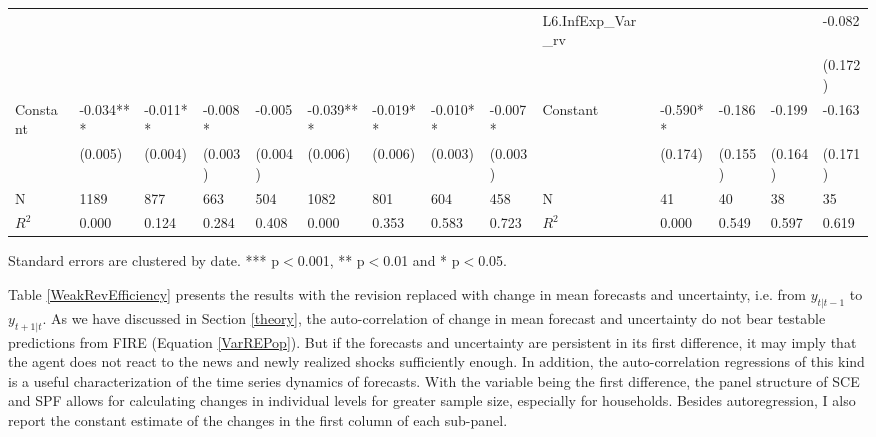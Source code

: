 \documentclass[12pt]{article}
\begin{document}
\begin{table}
\begin{adjustbox}{width={24cm},totalheight={14cm}}
\begin{threeparttable}
\begin{tabular}{llllllllllllll}
					&               &           &          &          &               &           &           &           & L6.InfExp\_Var\_rv  &               &          &          & -0.082   \\
					&               &           &          &          &               &           &           &           &                     &               &          &          & (0.172)  \\
					Constant               & -0.034***     & -0.011**  & -0.008*  & -0.005   & -0.039***     & -0.019**  & -0.010**  & -0.007*   & Constant               & -0.590**      & -0.186   & -0.199   & -0.163   \\
					& (0.005)       & (0.004)   & (0.003)  & (0.004)  & (0.006)       & (0.006)   & (0.003)   & (0.003)   &                     & (0.174)       & (0.155)  & (0.164)  & (0.171)  \\
					\hline 
					N                   & 1189          & 877       & 663      & 504      & 1082          & 801       & 604       & 458       & N                   & 41            & 40       & 38       & 35       \\
					$R^2$               & 0.000         & 0.124     & 0.284    & 0.408    & 0.000         & 0.353     & 0.583     & 0.723     & $R^2$               & 0.000         & 0.549    & 0.597    & 0.619 \\
					\hline    
				\end{tabular}
					\begin{tablenotes}
						\item Standard errors are clustered by date. *** p$<$0.001, ** p$<$0.01 and * p$<$0.05. 
					\end{tablenotes}
				\end{threeparttable}
				\end{adjustbox}
		\end{table}
	
	
	Table \ref{WeakRevEfficiency} presents the results with the revision replaced with change in mean forecasts and uncertainty, i.e. from $y_{t|t-1}$ to $y_{t+1|t}$. As we have discussed in Section \ref{theory}, the auto-correlation of change in mean forecast and uncertainty do not bear testable predictions from FIRE (Equation \ref{VarREPop}). But if the forecasts and uncertainty are persistent in its first difference, it may imply that the agent does not react to the news and newly realized shocks sufficiently enough. In addition, the auto-correlation regressions of this kind is a useful characterization of the time series dynamics of forecasts. With the variable being the first difference, the panel structure of SCE and SPF allows for calculating changes in individual levels for greater sample size, especially for households. Besides autoregression, I also report the constant estimate of the changes in the first column of each sub-panel. 
	
\end{document}
